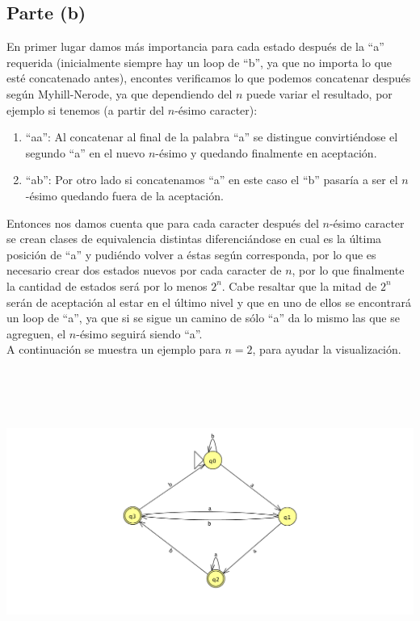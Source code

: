 \documentclass[11pt,letterpaper]{article}
\begin{document}
\subsection{Parte (b)}
En primer lugar damos más importancia para cada estado después de la ``a'' requerida (inicialmente siempre hay un loop de ``b'', ya que no importa lo que esté concatenado antes), encontes verificamos lo que podemos concatenar después según Myhill-Nerode, ya que dependiendo del $n$ puede variar el resultado, por ejemplo si tenemos (a partir del $n$-ésimo caracter):
\begin{enumerate}
\item{``aa'': Al concatenar al final de la palabra ``a'' se distingue convirtiéndose el segundo ``a'' en el nuevo $n$-ésimo y quedando finalmente en aceptación.}
\item{``ab'': Por otro lado si concatenamos ``a'' en este caso el ``b'' pasaría a ser el $n$-ésimo quedando fuera de la aceptación.}
\end{enumerate}
Entonces nos damos cuenta que para cada caracter después del $n$-ésimo caracter se crean clases de equivalencia distintas diferenciándose en cual es la última posición de ``a'' y pudiéndo volver a éstas según corresponda, por lo que es necesario crear dos estados nuevos por cada caracter de $n$, por lo que finalmente la cantidad de estados será por lo menos $2^n$. Cabe resaltar que la mitad de $2^n$ serán de aceptación al estar en el último nivel y que en uno de ellos se encontrará un loop de ``a'', ya que si se sigue un camino de sólo ``a'' da lo mismo las que se agreguen, el $n$-ésimo seguirá siendo ``a''. \\


A continuación se muestra un ejemplo para $n = 2$, para ayudar la visualización.

\includegraphics[height=10cm]{tarea_4-b.png}
\end{document}
